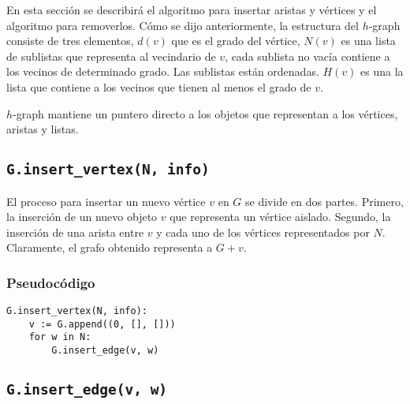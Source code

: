 \documentclass[a4paper,12pt]{article}
\begin{document}
En esta sección se describirá el algoritmo para insertar aristas y vértices y el algoritmo para removerlos.
Cómo se dijo anteriormente, la estructura del $h$-graph consiste de tres elementos, $d(v)$ que es el grado del vértice, $N(v)$ es una lista de sublistas que representa al vecindario de $v$, cada sublista no vacía contiene a los vecinos de determinado grado. Las sublistas están ordenadas. $H(v)$ es una la lista que contiene a los vecinos que tienen al menos el grado de $v$.

$h$-graph mantiene un puntero directo a los objetos que representan a los vértices, aristas y listas.


\subsection{\texttt{G.insert\_vertex(N, info)}}
\label{sec:hgraph:insert_vertex}

El proceso para insertar un nuevo vértice $v$ en $G$ se divide en dos partes.  Primero, la inserción de un nuevo objeto $v$ que representa un vértice aislado.  Segundo, la inserción de una arista entre $v$ y cada uno de los vértices representados por $N$.  Claramente, el grafo obtenido representa a $G + v$.

\subsubsection*{Pseudocódigo}

\begin{lstlisting}[float=h]
G.insert_vertex(N, info):
    v := G.append((0, [], []))
    for w in N:
        G.insert_edge(v, w)
\end{lstlisting}


\subsection{\texttt{G.insert\_edge(v, w)}}
\label{sec:hgraph:insert_edge}
\end{document}
